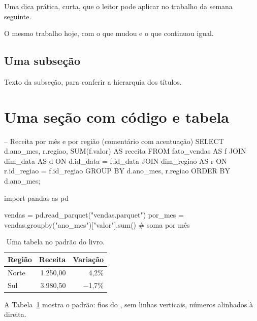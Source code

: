 \documentclass[11pt,twoside,openright,showtrims]{memoir}
\begin{document}
\begin{dica}
Uma dica prática, curta, que o leitor pode aplicar no trabalho da semana seguinte.
\end{dica}

{O mesmo trabalho hoje, com o que mudou e o que continuou igual.}

\subsection{Uma subseção}

Texto da subseção, para conferir a hierarquia dos títulos.

\section{Uma seção com código e tabela}
\label{sec:amostra-codigo}

\begin{sql}
-- Receita por mês e por região (comentário com acentuação)
SELECT
    d.ano_mes,
    r.regiao,
    SUM(f.valor) AS receita
FROM fato_vendas AS f
JOIN dim_data   AS d ON d.id_data   = f.id_data
JOIN dim_regiao AS r ON r.id_regiao = f.id_regiao
GROUP BY d.ano_mes, r.regiao
ORDER BY d.ano_mes;
\end{sql}

\begin{python}
import pandas as pd

vendas = pd.read_parquet("vendas.parquet")
por_mes = vendas.groupby("ano_mes")["valor"].sum()  # soma por mês
\end{python}

\begin{table}[htbp]
  \centering
  \caption{Uma tabela no padrão do livro.}
  \label{tab:amostra}
  \begin{tabular}{@{}lrr@{}}
    \toprule
    Região & Receita & Variação \\
    \midrule
    Norte  & 1.250,00 & 4,2\% \\
    Sul    & 3.980,50 & $-$1,7\% \\
    \bottomrule
  \end{tabular}
\end{table}

A Tabela~\ref{tab:amostra} mostra o padrão: fios do , sem linhas
verticais, números alinhados à direita.

\printbibliography[heading=bibintoc,title={Referências}]
\end{document}

